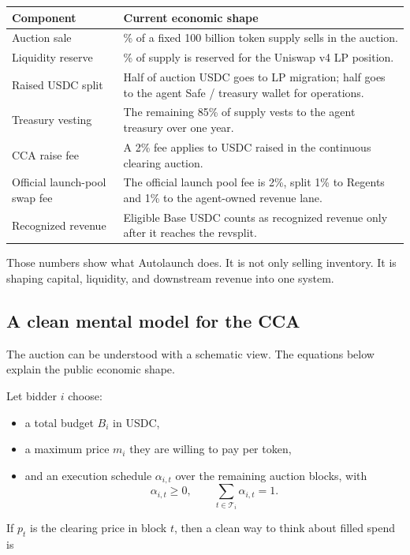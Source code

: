 \documentclass[11pt]{article}
\begin{document}
\begin{longtable}{>{\raggedright\arraybackslash}p{} >{\raggedright\arraybackslash}p{}}
\toprule
\textbf{Component} & \textbf{Current economic shape} \\
\midrule
Auction sale & 10\% of a fixed 100 billion token supply sells in the auction. \\
Liquidity reserve & 5\% of supply is reserved for the Uniswap v4 LP position. \\
Raised USDC split & Half of auction USDC goes to LP migration; half goes to the agent Safe / treasury wallet for operations. \\
Treasury vesting & The remaining 85\% of supply vests to the agent treasury over one year. \\
CCA raise fee & A 2\% fee applies to USDC raised in the continuous clearing auction. \\
Official launch-pool swap fee & The official launch pool fee is 2\%, split 1\% to Regents and 1\% to the agent-owned revenue lane. \\
Recognized revenue & Eligible Base USDC counts as recognized revenue only after it reaches the revsplit. \\
\bottomrule
\end{longtable}

Those numbers show what Autolaunch does. It is not only selling inventory. It is shaping capital, liquidity, and downstream revenue into one system.

\subsection{A clean mental model for the CCA}

The auction can be understood with a schematic view. The equations below explain the public economic shape.

Let bidder $i$ choose:

\begin{itemize}[leftmargin=1.5em]
  \item a total budget $B_i$ in USDC,
  \item a maximum price $m_i$ they are willing to pay per token,
  \item and an execution schedule $\alpha_{i,t}$ over the remaining auction blocks, with
  \[
    \alpha_{i,t} \ge 0,
    \qquad
    \sum_{t \in \mathcal{T}_i} \alpha_{i,t} = 1.
  \]
\end{itemize}

If $p_t$ is the clearing price in block $t$, then a clean way to think about filled spend is
\end{document}
